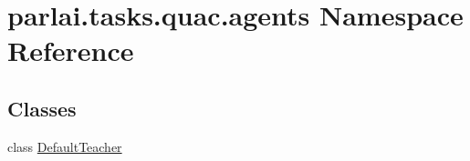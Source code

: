 \hypertarget{namespaceparlai_1_1tasks_1_1quac_1_1agents}{}\section{parlai.\+tasks.\+quac.\+agents Namespace Reference}
\label{namespaceparlai_1_1tasks_1_1quac_1_1agents}
\subsection*{Classes}
\begin{DoxyCompactItemize}
\item 
class \hyperlink{classparlai_1_1tasks_1_1quac_1_1agents_1_1DefaultTeacher}{Default\+Teacher}
\end{DoxyCompactItemize}
